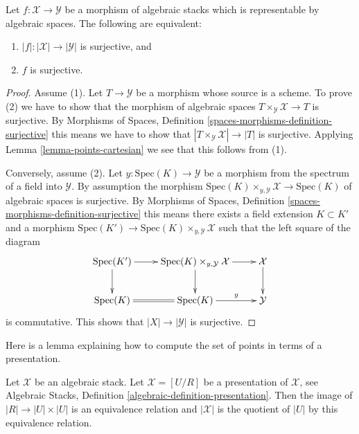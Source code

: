 \begin{lemma}
\label{lemma-characterize-surjective}
Let $f : \mathcal{X} \to \mathcal{Y}$ be a morphism of algebraic stacks
which is representable by algebraic spaces. The following are equivalent:
\begin{enumerate}
\item $|f| : |\mathcal{X}| \to |\mathcal{Y}|$ is surjective, and
\item $f$ is surjective.
\end{enumerate}
\end{lemma}

\begin{proof}
Assume (1). Let $T \to \mathcal{Y}$ be a morphism whose source is a scheme.
To prove (2) we have to show that the morphism of algebraic spaces
$T \times_{\mathcal{Y}} \mathcal{X} \to T$ is surjective. By
Morphisms of Spaces, Definition \ref{spaces-morphisms-definition-surjective}
this means we have to show that
$|T \times_{\mathcal{Y}} \mathcal{X}| \to |T|$ is surjective.
Applying
Lemma \ref{lemma-points-cartesian}
we see that this follows from (1).

\medskip\noindent
Conversely, assume (2). Let $y : \text{Spec}(K) \to \mathcal{Y}$ be a
morphism from the spectrum of a field into $\mathcal{Y}$. By assumption the
morphism
$\text{Spec}(K) \times_{y, \mathcal{Y}} \mathcal{X} \to \text{Spec}(K)$
of algebraic spaces is surjective. By
Morphisms of Spaces, Definition \ref{spaces-morphisms-definition-surjective}
this means there exists a field extension
$K \subset K'$ and a morphism
$\text{Spec}(K') \to \text{Spec}(K) \times_{y, \mathcal{Y}} \mathcal{X}$
such that the left square of the diagram
$$
\xymatrix{
\text{Spec}(K') \ar[r] \ar[d] &
\text{Spec}(K) \times_{y, \mathcal{Y}} \mathcal{X} \ar[d] \ar[r] &
\mathcal{X} \ar[d]
\\
\text{Spec}(K) \ar@{=}[r] &
\text{Spec}(K) \ar[r]^-y &
\mathcal{Y}
}
$$
is commutative. This shows that $|X| \to |\mathcal{Y}|$ is surjective.
\end{proof}

\noindent
Here is a lemma explaining how to compute the set of points in terms
of a presentation.

\begin{lemma}
\label{lemma-points-presentation}
Let $\mathcal{X}$ be an algebraic stack.
Let $\mathcal{X} = [U/R]$ be a presentation of $\mathcal{X}$, see
Algebraic Stacks, Definition \ref{algebraic-definition-presentation}.
Then the image of $|R| \to |U| \times |U|$ is an equivalence relation
and $|\mathcal{X}|$ is the quotient of $|U|$ by this equivalence relation.
\end{lemma}

